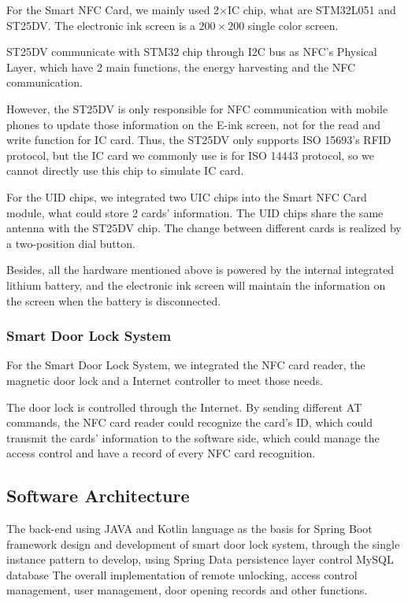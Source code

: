 \documentclass[11pt, a4paper]{article}
\begin{document}
For the Smart NFC Card, we mainly used 2$\times$IC chip, what are STM32L051 and ST25DV. The electronic ink screen is a $200 \times 200$ single color screen.

ST25DV communicate with STM32 chip through I2C bus as NFC's Physical Layer, which have 2 main functions, the energy harvesting and the NFC communication.

However, the ST25DV is only responsible for NFC communication with mobile phones to update those information on the E-ink screen, not for the read and write function for IC card. Thus, the ST25DV only supports ISO 15693's RFID protocol, but the IC card we commonly use is for ISO 14443 protocol, so we cannot directly use this chip to simulate IC card.

For the UID chips, we integrated two UIC chips into the Smart NFC Card module, what could store 2 cards' information. The UID chips share the same antenna with the ST25DV chip. The change between different cards is realized by a two-position dial button.

Besides, all the hardware mentioned above is powered by the internal integrated lithium battery, and the electronic ink screen will maintain the information on the screen when the battery is disconnected.

\subsubsection{Smart Door Lock System}

For the Smart Door Lock System, we integrated the NFC card reader, the magnetic door lock and a Internet controller to meet those needs.

The door lock is controlled through the Internet. By sending different AT commands, the NFC card reader could recognize the card's ID, which could transmit the cards' information to the software side, which could manage the access control and have a record of every NFC card recognition.


\subsection{Software Architecture}
The back-end using JAVA and Kotlin language as the basis for Spring Boot framework design and development of smart door lock system, through the single instance pattern to develop, using Spring Data persistence layer control MySQL database  The overall implementation of remote unlocking, access control management, user management, door opening records and other functions.
\end{document}
